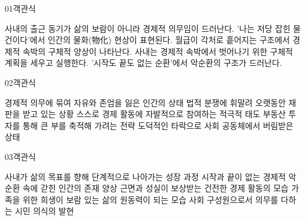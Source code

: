 \documentclass[fs85,seriesWit]{korfarm-base}
\begin{document}
\kfBeginMC
\begin{kfQBlock}{01}{객관식}
\begin{kfChoices}
\kfChoice 사내의 출근 동기가 삶의 보람이 아니라 경제적 의무임이 드러난다.
\kfChoice '나는 저당 잡힌 물건이다'에서 인간의 물화(物化) 현상이 표현된다.
\kfChoice 월급이 각처로 흩어지는 구조에서 경제적 속박의 구체적 양상이 나타난다.
\kfChoice 사내는 경제적 속박에서 벗어나기 위한 구체적 계획을 세우고 실행한다.
\kfChoice '시작도 끝도 없는 순환'에서 악순환의 구조가 드러난다.
\end{kfChoices}
\end{kfQBlock}

\begin{kfQBlock}{02}{객관식}
\begin{kfChoices}
\kfChoice 경제적 의무에 묶여 자유와 존엄을 잃은 인간의 상태
\kfChoice 법적 분쟁에 휘말려 오랫동안 재판을 받고 있는 상황
\kfChoice 스스로 경제 활동에 자발적으로 참여하는 적극적 태도
\kfChoice 부동산 투자를 통해 큰 부를 축적해 가려는 전략
\kfChoice 도덕적인 타락으로 사회 공동체에서 버림받은 상태
\end{kfChoices}
\end{kfQBlock}

\begin{kfQBlock}{03}{객관식}
\begin{kfChoices}
\kfChoice 사내가 삶의 목표를 향해 단계적으로 나아가는 성장 과정
\kfChoice 시작과 끝이 없는 경제적 악순환 속에 갇힌 인간의 존재 양상
\kfChoice 근면과 성실이 보상받는 건전한 경제 활동의 모습
\kfChoice 가족을 위한 희생이 보람 있는 삶의 원동력이 되는 모습
\kfChoice 사회 구성원으로서 의무를 다하는 시민 의식의 발현
\end{kfChoices}
\end{kfQBlock}
\end{document}

